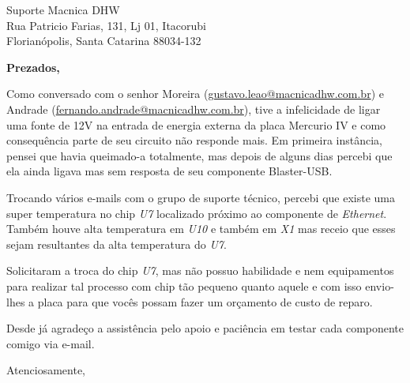 \documentclass{letter}
\begin{document}

\begin{letter}{Suporte Macnica DHW\\ Rua Patricio Farias, 131, Lj 01, Itacorubi \\ Florianópolis, Santa Catarina 88034-132} %


\opening{\textbf{Prezados,}}
 
Como conversado com o senhor Moreira (\url{gustavo.leao@macnicadhw.com.br}) e Andrade (\url{fernando.andrade@macnicadhw.com.br}), tive a infelicidade de ligar uma fonte de 12V na entrada de energia externa da placa Mercurio IV e como consequência parte de seu circuito não responde mais. Em primeira instância, pensei que havia queimado-a totalmente, mas depois de alguns dias percebi que ela ainda ligava mas sem resposta de seu componente Blaster-USB.

Trocando vários e-mails com o grupo de suporte técnico, percebi que existe uma super temperatura no chip \textit{U7} localizado próximo ao componente de \textit{Ethernet}. Também houve alta temperatura em \textit{U10} e também em \textit{X1} mas receio que esses sejam resultantes da alta temperatura do \textit{U7}.

Solicitaram a troca do chip \textit{U7}, mas não possuo habilidade e nem equipamentos para realizar tal processo com chip tão pequeno quanto aquele e com isso envio-lhes a placa para que vocês possam fazer um orçamento de custo de reparo.

Desde já agradeço a assistência pelo apoio e paciência em testar cada componente comigo via e-mail.



\vspace{2\parskip} %
\closing{Atenciosamente,}
\vspace{2\parskip} %



\end{letter}
 
\end{document}
